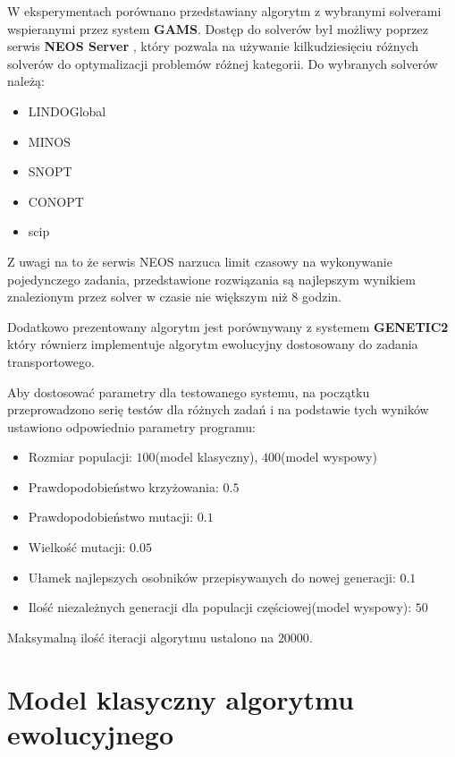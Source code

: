 W eksperymentach porównano przedstawiany algorytm z wybranymi solverami wspieranymi przez system \textbf{GAMS}. Dostęp do solverów był możliwy poprzez serwis 
\textbf{NEOS Server} \cite{NEOS-1,NEOS-2,NEOS-3}, który pozwala na używanie kilkudziesięciu różnych solverów do optymalizacji problemów różnej kategorii. Do wybranych 
solverów należą:

\begin{itemize}
    \item LINDOGlobal
    \item MINOS
    \item SNOPT
    \item CONOPT
    \item scip
\end{itemize}

Z uwagi na to że serwis NEOS narzuca limit czasowy na wykonywanie pojedynczego zadania, przedstawione rozwiązania są najlepszym wynikiem znalezionym 
przez solver w czasie nie większym niż 8 godzin.

Dodatkowo prezentowany algorytm jest porównywany z systemem \textbf{GENETIC2}\cite{ALG-GEN-BOOK} który równierz implementuje algorytm ewolucyjny 
dostosowany do zadania transportowego.

Aby dostosować parametry dla testowanego systemu, na początku przeprowadzono serię testów dla różnych zadań i na podstawie tych wyników ustawiono 
odpowiednio parametry programu:

\begin{itemize}
    \item Rozmiar populacji: $100$(model klasyczny), $400$(model wyspowy)
    \item Prawdopodobieństwo krzyżowania: $0.5$
    \item Prawdopodobieństwo mutacji: $0.1$
    \item Wielkość mutacji: $0.05$
    \item Ułamek najlepszych osobników przepisywanych do nowej generacji: $0.1$
    \item Ilość niezależnych generacji dla populacji częściowej(model wyspowy): $50$
\end{itemize}

Maksymalną ilość iteracji algorytmu ustalono na $20000$.

\section{Model klasyczny algorytmu ewolucyjnego}

